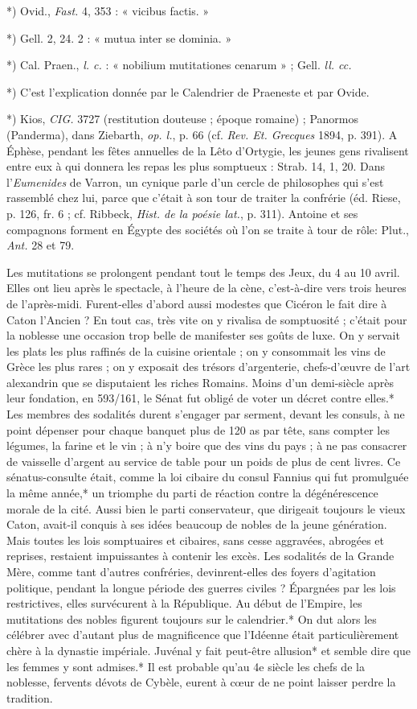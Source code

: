 \documentclass[a4paper, 11pt, oneside, polutonikogreek, french]{article}
\begin{document}
*) Ovid., \emph{Fast.} 4, 353 : « vicibus factis. »

*) Gell. 2, 24. 2 : « mutua inter se dominia. »

*) Cal. Praen., \emph{l. c.} : « nobilium mutitationes cenarum » ; Gell. \emph{ll. cc.}

*) C'est l'explication donnée par le Calendrier de Praeneste et par Ovide.

*) Kios, \emph{CIG.} 3727 (restitution douteuse ; époque romaine) ; Panormos (Panderma), dans Ziebarth, \emph{op. l.}, p. 66 (cf. \emph{Rev. Et. Grecques} 1894, p. 391). A Éphèse, pendant les fêtes annuelles de la Lêto d'Ortygie, les jeunes gens rivalisent entre eux à qui donnera les repas les plus somptueux : Strab. 14, 1, 20. Dans l'\emph{Eumenides} de Varron, un cynique parle d'un cercle de philosophes qui s'est rassemblé chez lui, parce que c'était à son tour de traiter la confrérie (éd. Riese, p. 126, fr. 6 ; cf. Ribbeck, \emph{Hist. de la poésie lat.}, p. 311). Antoine et ses compagnons forment en Égypte des sociétés où l'on se traite à tour de rôle: Plut., \emph{Ant.} 28 et 79.

Les mutitations se prolongent pendant tout le temps des Jeux, du 4 au 10 avril. Elles ont lieu après le spectacle, à l'heure de la cène, c'est-à-dire vers trois heures de l'après-midi. Furent-elles d'abord aussi modestes que Cicéron le fait dire à Caton l'Ancien ? En tout cas, très vite on y rivalisa de somptuosité ; c'était pour la noblesse une occasion trop belle de manifester ses goûts de luxe. On y servait les plats les plus raffinés de la cuisine orientale ; on y consommait les vins de Grèce les plus rares ; on y exposait des trésors d'argenterie, chefs-d'œuvre de l'art alexandrin que se disputaient les riches Romains. Moins d'un demi-siècle après leur fondation, en 593/161, le Sénat fut obligé de voter un décret contre elles.* Les membres des sodalités durent s'engager par serment, devant les consuls, à ne point dépenser pour chaque banquet plus de 120 as par tête, sans compter les légumes, la farine et le vin ; à n'y boire que des vins du pays ; à ne pas consacrer de vaisselle d'argent au service de table pour un poids de plus de cent livres. Ce sénatus-consulte était, comme la loi cibaire du consul Fannius qui fut promulguée la même année,* un triomphe du parti de réaction contre la dégénérescence morale de la cité. Aussi bien le parti conservateur, que dirigeait toujours le vieux Caton, avait-il conquis à ses idées beaucoup de nobles de la jeune génération. Mais toutes les lois somptuaires et cibaires, sans cesse aggravées, abrogées et reprises, restaient impuissantes à contenir les excès. Les sodalités de la Grande Mère, comme tant d'autres confréries, devinrent-elles des foyers d'agitation politique, pendant la longue période des guerres civiles ? Épargnées par les lois restrictives, elles survécurent à la République. Au début de l'Empire, les mutitations des nobles figurent toujours sur le calendrier.* On dut alors les célébrer avec d'autant plus de magnificence que l'Idéenne était particulièrement chère à la dynastie impériale. Juvénal y fait peut-être allusion* et semble dire que les femmes y sont admises.* Il est probable qu'au 4e siècle les chefs de la noblesse, fervents dévots de Cybèle, eurent à cœur de ne point laisser perdre la tradition.
\end{document}
